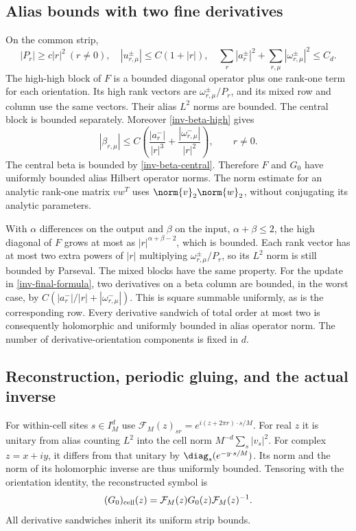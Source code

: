 \subsection{Alias bounds with two fine derivatives}

On the common strip,
\[
 |P_r|\ge c|r|^2\ (r\ne0),\quad
 |u_{r,\mu}^{\pm}|\le C(1+|r|),\quad
 \sum_r|a_r^\pm|^2+
       \sum_{r,\mu}|\omega_{r,\mu}^\pm|^2\le C_d.
\]
The high-high block of $F$ is a bounded diagonal operator plus one
rank-one term for each orientation. Its high rank vectors are
$\omega_{r,\mu}^{\pm}/P_r$, and its mixed row and column use the
same vectors. Their alias $L^2$ norms are bounded. The central block
is bounded separately. Moreover \eqref{inv-beta-high} gives
\begin{equation}\label{inv-beta-estimate}
 |\beta_{r,\mu}|\le
 C\left(\frac{|a_r^-|}{|r|^3}
             +\frac{|\omega_{r,\mu}^-|}{|r|^2}\right),\qquad r\ne0.
\end{equation}
The central beta is bounded by \eqref{inv-beta-central}.
Therefore $F$ and $G_0$ have uniformly bounded alias Hilbert operator
norms. The norm estimate for an analytic rank-one matrix $v w^T$
uses $\norm{v}_2\norm{w}_2$, without conjugating its analytic parameters.

With $\alpha$ differences on the output and $\beta$ on the input,
$\alpha+\beta\le2$, the high diagonal of $F$ grows at most as
$|r|^{\alpha+\beta-2}$, which is bounded. Each rank vector has at
most two extra powers of $|r|$ multiplying
$\omega_{r,\mu}^{\pm}/P_r$, so its $L^2$ norm is still bounded by
Parseval. The mixed blocks have the same property. For the update in
\eqref{inv-final-formula}, two derivatives on a beta column are bounded,
in the worst case, by $C(|a_r^-|/|r|+|\omega_{r,\mu}^-|)$.
This is square summable uniformly, as is the corresponding row.
Every derivative sandwich of total order at most two is consequently
holomorphic and uniformly bounded in alias operator norm. The number
of derivative-orientation components is fixed in $d$.

\subsection{Reconstruction, periodic gluing, and the actual inverse}

For within-cell sites $s\in I_M^d$ use
$\mathcal F_M(z)_{sr}=e^{i(z+2\pi r)\cdot s/M}$.
For real $z$ it is unitary from alias counting $L^2$ into the cell
norm $M^{-d}\sum_s|v_s|^2$. For complex $z=x+iy$, it differs from
that unitary by $\diag_s(e^{-y\cdot s/M})$. Its norm and the norm of
its holomorphic inverse are thus uniformly bounded. Tensoring with
the orientation identity, the reconstructed symbol is
\[
 (G_0)_{\rm cell}(z)=\mathcal F_M(z)G_0(z)\mathcal F_M(z)^{-1}.
\]
All derivative sandwiches inherit its uniform strip bounds.

